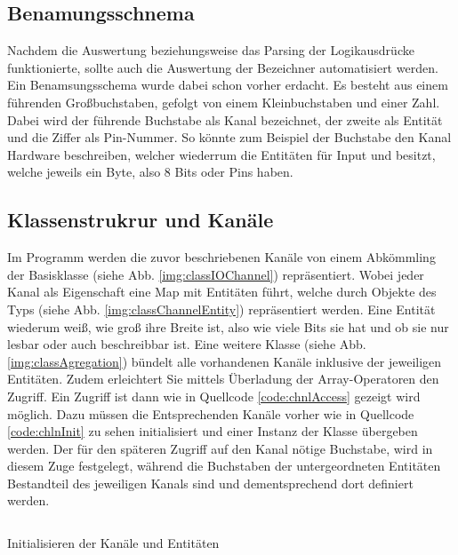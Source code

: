 \subsection{Benamungsschnema}\label{kap:ums:banamsung}
Nachdem die Auswertung beziehungsweise das Parsing der Logikausdrücke funktionierte, sollte auch die Auswertung der Bezeichner automatisiert werden. Ein Benamsungsschema wurde dabei schon vorher erdacht. Es besteht aus einem führenden Großbuchstaben, gefolgt von einem Kleinbuchstaben und einer Zahl. Dabei wird der führende Buchstabe als Kanal bezeichnet, der zweite als Entität und die Ziffer als Pin-Nummer. So könnte zum Beispiel der Buchstabe  den Kanal Hardware beschreiben, welcher  wiederrum die Entitäten  für Input und  besitzt, welche jeweils ein Byte, also 8 Bits oder Pins haben. 

\subsection{Klassenstrukrur und Kanäle}\label{kap:ums:klassen}
Im Programm werden die zuvor beschriebenen Kanäle von einem Abkömmling der Basisklasse  (siehe Abb. \ref{img:classIOChannel}) repräsentiert. Wobei jeder Kanal als Eigenschaft eine Map mit Entitäten führt, welche durch Objekte des Typs  (siehe Abb. \ref{img:classChannelEntity}) repräsentiert werden. Eine Entität wiederum weiß, wie groß ihre Breite ist, also wie viele Bits sie hat und ob sie nur lesbar oder auch beschreibbar ist. Eine weitere Klasse  (siehe Abb. \ref{img:classAgregation}) bündelt alle vorhandenen Kanäle inklusive der jeweiligen Entitäten. Zudem erleichtert Sie mittels Überladung der Array-Operatoren den Zugriff. Ein Zugriff ist dann wie in Quellcode \ref{code:chnlAccess} gezeigt wird möglich. Dazu müssen die Entsprechenden Kanäle vorher wie in Quellcode \ref{code:chlnInit} zu sehen initialisiert und einer Instanz der Klasse  übergeben werden. Der für den späteren Zugriff auf den Kanal nötige Buchstabe, wird in diesem Zuge festgelegt, während die Buchstaben der untergeordneten Entitäten Bestandteil des jeweiligen Kanals sind und dementsprechend dort definiert werden. 


\begin{listing}[H]
	\inputminted[numbersep=1pt,fontsize=\scriptsize,frame=single, firstline=364,lastline=369]{c}{./code/main-klassenstruktur.cpp}
	\caption{Initialisieren der Kanäle und Entitäten}
	\label{code:chlnInit}
\end{listing}


